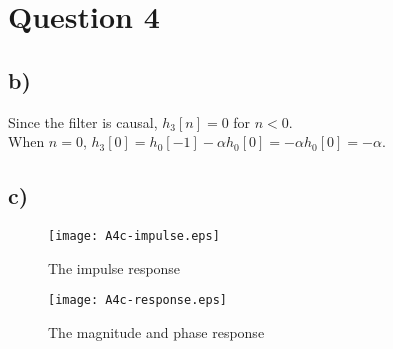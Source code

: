 \documentclass{article}
\newenvironment{homeworkProblem}[1]{
	\section*{#1}
	}{
}
\newenvironment{homeworkSection}[1]{
	\subsection*{#1}
	}{
}
\begin{document}
\begin{homeworkProblem}{Question 4}
\begin{homeworkSection}{b)}
Since the filter is causal, $h_3[n]=0$ for $n<0$.\\

When $n=0$, $h_3[0] = h_0[-1] - \alpha h_0[0] = -\alpha h_0[0] = -\alpha$.

\end{homeworkSection}

\begin{homeworkSection}{c)}

\begin{figure}[H]
\begin{minipage}[t]{0.5\linewidth}
\centering
\texttt{[image: A4c-impulse.eps]}
\caption{The impulse response}
\label{A4c-impulse}
\end{minipage}
\begin{minipage}[t]{0.5\linewidth}
\centering
\texttt{[image: A4c-response.eps]}
\caption{The magnitude and phase response}
\label{A4c-response}
\end{minipage}
\end{figure}

\end{homeworkSection}

\end{homeworkProblem}
\end{document}
